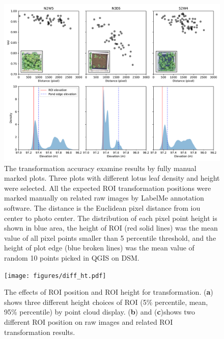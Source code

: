 \documentclass[doublespacing]{configs/bmcart}
\begin{document}
\begin{backmatter}
\begin{figure}[!htb]
  \includegraphics[width=0.95\linewidth]{figures/dist.pdf}
  \caption{The transformation accuracy examine results by fully manual marked plots. Three plots with different lotus leaf density and height were selected. All the expected ROI transformation positions were marked manually on related raw images by LabelMe annotation software. The distance is the Euclidean pixel distance from \acrfull*{iou} center to photo center. The distribution of each pixel point height is shown in blue area, the height of ROI (red solid lines) was the mean value of all pixel points smaller than 5 percentile threshold, and the height of plot edge (blue broken lines) was the mean value of random 10 points picked in QGIS on DSM.}
  \label{fig:dist}
\end{figure}

\begin{figure}[!htb]
  \texttt{[image: figures/diff\_ht.pdf]}
  \caption{The effects of ROI position and ROI height for transformation. (\textbf{a}) shows three different height choices of ROI (5\% percentile, mean, 95\% percentile) by point cloud display. (\textbf{b}) and (\textbf{c})shows two different ROI position on raw images and related ROI transformation results.}
  \label{fig:ht_diff}
\end{figure}


\end{backmatter}
\end{document}
